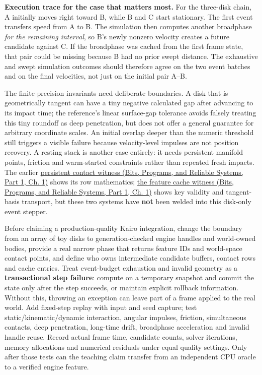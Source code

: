 \textbf{Execution trace for the case that matters most.} For the three-disk chain, A initially moves right toward B, while B and C start stationary. The first event transfers speed from A to B. The simulation then computes another broadphase \emph{for the remaining interval}, so B's newly nonzero velocity creates a future candidate against C. If the broadphase was cached from the first frame state, that pair could be missing because B had no prior swept distance. The exhaustive and swept simulation outcomes should therefore agree on the two event batches and on the final velocities, not just on the initial pair A--B.

The finite-precision invariants need deliberate boundaries. A disk that is geometrically tangent can have a tiny negative calculated gap after advancing to its impact time; the reference's linear surface-gap tolerance avoids falsely treating this tiny roundoff as deep penetration, but does not offer a general guarantee for arbitrary coordinate scales. An initial overlap deeper than the numeric threshold still triggers a visible failure because velocity-level impulses are not position recovery. A resting stack is another case entirely: it needs persistent manifold points, friction and warm-started constraints rather than repeated fresh impacts. The earlier \href{../01-Bits-Programs-and-Reliable-Systems-P01/main.pdf\#source-file-44c320ffad9698c7abd453e2}{persistent contact witness (Bits, Programs, and Reliable Systems, Part 1, Ch. 1)} shows its row mathematics; \href{../01-Bits-Programs-and-Reliable-Systems-P01/main.pdf\#source-file-830b13449e1c6505af693753}{the feature cache witness (Bits, Programs, and Reliable Systems, Part 1, Ch. 1)} shows key validity and tangent-basis transport, but these two systems have \textbf{not} been welded into this disk-only event stepper.

Before claiming a production-quality Kairo integration, change the boundary from an array of toy disks to generation-checked engine handles and world-owned bodies, provide a real narrow phase that returns feature IDs and world-space contact points, and define who owns intermediate candidate buffers, contact rows and cache entries. Treat event-budget exhaustion and invalid geometry as a \textbf{transactional step failure}: compute on a temporary snapshot and commit the state only after the step succeeds, or maintain explicit rollback information. Without this, throwing an exception can leave part of a frame applied to the real world. Add fixed-step replay with input and seed capture; test static/kinematic/dynamic interaction, angular impulses, friction, simultaneous contacts, deep penetration, long-time drift, broadphase acceleration and invalid handle reuse. Record actual frame time, candidate counts, solver iterations, memory allocations and numerical residuals under equal quality settings. Only after those tests can the teaching claim transfer from an independent CPU oracle to a verified engine feature.

